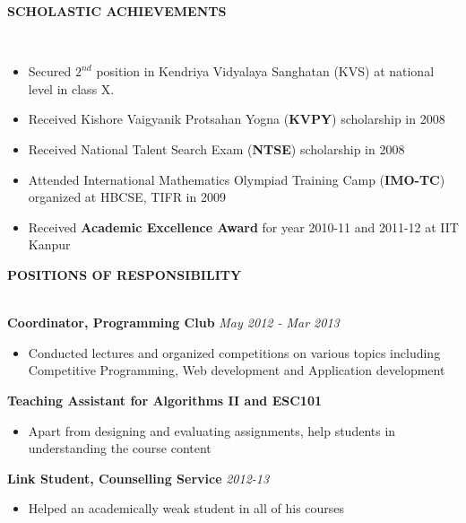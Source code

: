 \documentclass[10pt]{article}
\newcommand{\cvsectiontitle}[1]{
    		\colorbox{gray!40}{%
        \begin{minipage}{0.989\linewidth}%
            \vspace*{1pt}%
            \large\indent\textbf{#1}
            \vspace*{1pt}%
        \end{minipage}%
   		}\\[1mm]
		}
\begin{document}
\cvsectiontitle{SCHOLASTIC ACHIEVEMENTS}
\vspace{-0.6cm}
\begin{itemize}[leftmargin=0.5cm]
\setlength{\itemsep}{0.1mm}
\item Secured $2^{nd}$ position in Kendriya Vidyalaya Sanghatan (KVS) at national level in class X.
\item Received Kishore Vaigyanik Protsahan Yogna (\textbf{KVPY}) scholarship in 2008
\item Received National Talent Search Exam (\textbf{NTSE}) scholarship in 2008
\item Attended International Mathematics Olympiad Training Camp (\textbf{IMO-TC}) organized at HBCSE, TIFR in 2009
\item Received \textbf{Academic Excellence Award} for year 2010-11 and 2011-12 at IIT Kanpur
\end{itemize}

\cvsectiontitle{POSITIONS OF RESPONSIBILITY}
\textbf{Coordinator, Programming Club} \hfill \textit{May 2012 - Mar 2013}
\vspace{-0.2cm}
\begin{itemize}
\item Conducted lectures and organized competitions on various topics including Competitive Programming, Web development and Application development
\end{itemize}
\vspace{-0.1cm}
\textbf{Teaching Assistant for Algorithms II and ESC101}
\vspace{-0.2cm}
\begin{itemize}
\item Apart from designing and evaluating assignments, help students in understanding the course content
\end{itemize}
\vspace{-0.1cm}
\textbf{Link Student, Counselling Service} \hfill \textit{2012-13}
\vspace{-0.2cm}
\begin{itemize}
\item Helped an academically weak student in all of his courses
\end{itemize}
\end{document}
